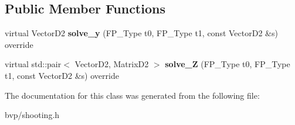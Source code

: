 \subsection*{Public Member Functions}
\begin{DoxyCompactItemize}
\item 
\mbox{\label{classSF__Automatic_a1805f867ada14ddc960d72da0c8717c5}} 
virtual Vector\+D2 {\bfseries solve\+\_\+y} (F\+P\+\_\+\+Type t0, F\+P\+\_\+\+Type t1, const Vector\+D2 \&s) override
\item 
\mbox{\label{classSF__Automatic_a42df8fe14e093057d2fe40cb42a0460e}} 
virtual std\+::pair$<$ Vector\+D2, Matrix\+D2 $>$ {\bfseries solve\+\_\+Z} (F\+P\+\_\+\+Type t0, F\+P\+\_\+\+Type t1, const Vector\+D2 \&s) override
\end{DoxyCompactItemize}


The documentation for this class was generated from the following file\+:\begin{DoxyCompactItemize}
\item 
bvp/shooting.\+h\end{DoxyCompactItemize}
